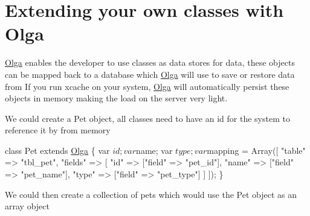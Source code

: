 \hypertarget{olga_your_own_classes_with_olga}{}\section{Extending your own classes with Olga}\label{olga_your_own_classes_with_olga}
\hyperlink{classOlga}{Olga} enables the developer to use classes as data stores for data, these objects can be mapped back to a database which \hyperlink{classOlga}{Olga} will use to save or restore data from If you run xcache on your system, \hyperlink{classOlga}{Olga} will automatically persist these objects in memory making the load on the server very light.

We could create a Pet object, all classes need to have an id for the system to reference it by from memory 
\begin{DoxyCode}
\textcolor{keyword}{class }Pet \textcolor{keyword}{extends} \hyperlink{classOlga}{Olga} \{
     var $id;
     var $name;
     var $type;

     var $mapping = Array([  \textcolor{stringliteral}{"table"} => \textcolor{stringliteral}{"tbl\_pet"},
                             \textcolor{stringliteral}{"fields"} => [
                                 \textcolor{stringliteral}{"id"} => [\textcolor{stringliteral}{"field"} => \textcolor{stringliteral}{"pet\_id"}],
                                 \textcolor{stringliteral}{"name"} => [\textcolor{stringliteral}{"field"} => \textcolor{stringliteral}{"pet\_name"}],
                                 \textcolor{stringliteral}{"type"} => [\textcolor{stringliteral}{"field"} => \textcolor{stringliteral}{"pet\_type"}]
                             ]
                    ]);
\}
\end{DoxyCode}


We could then create a collection of pets which would use the Pet object as an array object


 
